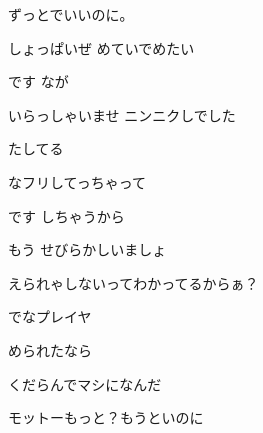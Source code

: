 \documentclass[a4paper,tate,twocolumn,12pt]{ltjtarticle}
\begin{document}
\thispagestyle{empty}

\begin{center}
{\LARGE {}}

{\large ずっとでいいのに。}
\end{center}

\vspace{1em}

\begin{flushleft}

\noindent\begin{minipage}{\linewidth}
しょっぱいぜ めていでめたい

です なが

いらっしゃいませ ニンニクしでした

たしてる
\end{minipage}

\vspace{1em}

\noindent\begin{minipage}{\linewidth}
 なフリしてっちゃって

です しちゃうから

もう せびらかしいましょ

えられゃしないってわかってるからぁ？
\end{minipage}

\vspace{2em}

\noindent\begin{minipage}{\linewidth}
でなプレイヤ

められたなら

くだらんでマシになんだ

モットーもっと？もうといのに
\end{minipage}

\vspace{2em}


\end{flushleft}
\end{document}
